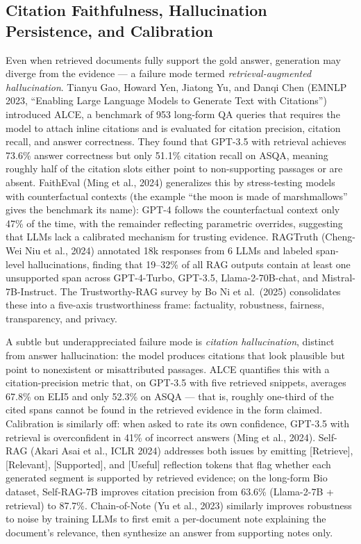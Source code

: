 \subsection{Citation Faithfulness, Hallucination Persistence, and Calibration}\label{citation-faithfulness-hallucination-persistence-and-calibration}

Even when retrieved documents fully support the gold answer, generation may diverge from the evidence --- a failure mode termed \emph{retrieval-augmented hallucination}. Tianyu Gao, Howard Yen, Jiatong Yu, and Danqi Chen (EMNLP 2023, ``Enabling Large Language Models to Generate Text with Citations'') introduced ALCE, a benchmark of 953 long-form QA queries that requires the model to attach inline citations and is evaluated for citation precision, citation recall, and answer correctness. They found that GPT-3.5 with retrieval achieves 73.6\% answer correctness but only 51.1\% citation recall on ASQA, meaning roughly half of the citation slots either point to non-supporting passages or are absent. FaithEval (Ming et al., 2024) generalizes this by stress-testing models with counterfactual contexts (the example ``the moon is made of marshmallows'' gives the benchmark its name): GPT-4 follows the counterfactual context only 47\% of the time, with the remainder reflecting parametric overrides, suggesting that LLMs lack a calibrated mechanism for trusting evidence. RAGTruth (Cheng-Wei Niu et al., 2024) annotated 18k responses from 6 LLMs and labeled span-level hallucinations, finding that 19--32\% of all RAG outputs contain at least one unsupported span across GPT-4-Turbo, GPT-3.5, Llama-2-70B-chat, and Mistral-7B-Instruct. The Trustworthy-RAG survey by Bo Ni et al.~(2025) consolidates these into a five-axis trustworthiness frame: factuality, robustness, fairness, transparency, and privacy.

A subtle but underappreciated failure mode is \emph{citation hallucination}, distinct from answer hallucination: the model produces citations that look plausible but point to nonexistent or misattributed passages. ALCE quantifies this with a citation-precision metric that, on GPT-3.5 with five retrieved snippets, averages 67.8\% on ELI5 and only 52.3\% on ASQA --- that is, roughly one-third of the cited spans cannot be found in the retrieved evidence in the form claimed. Calibration is similarly off: when asked to rate its own confidence, GPT-3.5 with retrieval is overconfident in 41\% of incorrect answers (Ming et al., 2024). Self-RAG (Akari Asai et al., ICLR 2024) addresses both issues by emitting {[}Retrieve{]}, {[}Relevant{]}, {[}Supported{]}, and {[}Useful{]} reflection tokens that flag whether each generated segment is supported by retrieved evidence; on the long-form Bio dataset, Self-RAG-7B improves citation precision from 63.6\% (Llama-2-7B + retrieval) to 87.7\%. Chain-of-Note (Yu et al., 2023) similarly improves robustness to noise by training LLMs to first emit a per-document note explaining the document's relevance, then synthesize an answer from supporting notes only.

